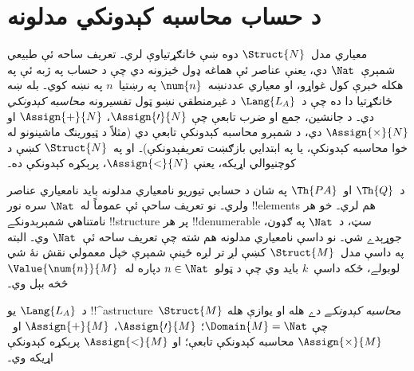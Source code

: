 \documentclass[../../../include/open-logic-section]{subfiles}
\begin{document}
\section{د حساب محاسبه کېدونکي مدلونه}

\begin{explain}
معياري مدل~$\Struct{N}$ دوه ښې ځانګړتياوې لري۔ تعريف ساحه ئې طبيعي
شمېرې~$\Nat$ دي، يعنې عناصر ئې هماغه ډول څيزونه دي چې د حساب
په ژبه ئې په هکله خبرې کول غواړو، او معياري عددنښه~$\num{n}$ په
رښتيا~$n$ په نښه کوي۔ بله ښه ځانګړتيا دا ده چې د~$\Lang{L_A}$ د
غيرمنطقي نښو ټول تفسيرونه \emph{محاسبه کېدونکي} دي۔ د جانشين، جمع
او ضرب تابعې چې $\Assign{\prime}{N}$، $\Assign{+}{N}$ او
$\Assign{\times}{N}$ دي، د شمېرو محاسبه کېدونکې تابعې دي (مثلاً د
ټيورينګ ماشينونو له خوا محاسبه کېدونکې، يا په ابتدايي بازګښت
تعريفېدونکې)۔ او په~$\Struct{N}$ کښې د کوچنيوالي اړيکه، يعنې
$\Assign{<}{N}$، پرېکړه کېدونکې ده۔

د~$\Th{Q}$ او~$\Th{PA}$ په شان د حسابي تيوريو نامعياري مدلونه بايد
نامعياري عناصر ولري۔ نو تعريف ساحې ئې عموماً له~$\Nat$ سره نور
!!{element}s هم لري۔ خو هر نامتناهي شمېرېدونکے !!{structure} پر هر
!!{denumerable} سټ، د~$\Nat$ په ګډون، جوړېدے شي۔ نو داسې نامعياري
مدلونه هم شته چې تعريف ساحه ئې~$\Nat$ وي۔ البته په داسې
مدل~$\Struct{M}$ کښې لږ تر لږه ځينې شمېرې خپل معمولي نقش نۀ شي
لوبولے، ځکه داسې~$k$ بايد وي چې د ټولو~$n \in \Nat$ دپاره
له~$\Value{\num{n}}{M}$ څخه بېل وي۔
\end{explain}

\begin{defn}
د~$\Lang{L_A}$ يو !!^a{structure}~$\Struct{M}$ \emph{محاسبه
کېدونکے} دے هله او يوازې هله چې $\Domain{M}=\Nat$؛
$\Assign{\prime}{M}$، $\Assign{+}{M}$ او~$\Assign{\times}{M}$
محاسبه کېدونکې تابعې؛ او $\Assign{<}{M}$ پرېکړه کېدونکې اړيکه وي۔
\end{defn}
\end{document}
